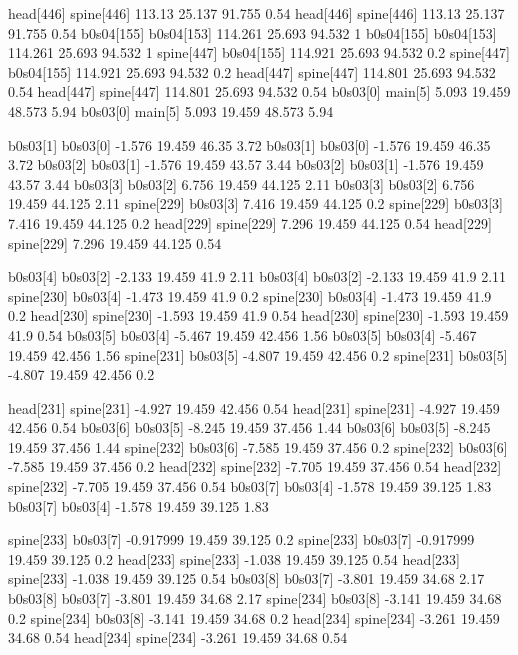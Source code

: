 head[446]    spine[446]    113.13    25.137    91.755    0.54
head[446]    spine[446]    113.13    25.137    91.755    0.54
b0s04[155]    b0s04[153]    114.261    25.693    94.532    1
b0s04[155]    b0s04[153]    114.261    25.693    94.532    1
spine[447]    b0s04[155]    114.921    25.693    94.532    0.2
spine[447]    b0s04[155]    114.921    25.693    94.532    0.2
head[447]    spine[447]    114.801    25.693    94.532    0.54
head[447]    spine[447]    114.801    25.693    94.532    0.54
b0s03[0]    main[5]    5.093    19.459    48.573    5.94
b0s03[0]    main[5]    5.093    19.459    48.573    5.94


b0s03[1]    b0s03[0]    -1.576    19.459    46.35    3.72
b0s03[1]    b0s03[0]    -1.576    19.459    46.35    3.72
b0s03[2]    b0s03[1]    -1.576    19.459    43.57    3.44
b0s03[2]    b0s03[1]    -1.576    19.459    43.57    3.44
b0s03[3]    b0s03[2]    6.756    19.459    44.125    2.11
b0s03[3]    b0s03[2]    6.756    19.459    44.125    2.11
spine[229]    b0s03[3]    7.416    19.459    44.125    0.2
spine[229]    b0s03[3]    7.416    19.459    44.125    0.2
head[229]    spine[229]    7.296    19.459    44.125    0.54
head[229]    spine[229]    7.296    19.459    44.125    0.54


b0s03[4]    b0s03[2]    -2.133    19.459    41.9    2.11
b0s03[4]    b0s03[2]    -2.133    19.459    41.9    2.11
spine[230]    b0s03[4]    -1.473    19.459    41.9    0.2
spine[230]    b0s03[4]    -1.473    19.459    41.9    0.2
head[230]    spine[230]    -1.593    19.459    41.9    0.54
head[230]    spine[230]    -1.593    19.459    41.9    0.54
b0s03[5]    b0s03[4]    -5.467    19.459    42.456    1.56
b0s03[5]    b0s03[4]    -5.467    19.459    42.456    1.56
spine[231]    b0s03[5]    -4.807    19.459    42.456    0.2
spine[231]    b0s03[5]    -4.807    19.459    42.456    0.2


head[231]    spine[231]    -4.927    19.459    42.456    0.54
head[231]    spine[231]    -4.927    19.459    42.456    0.54
b0s03[6]    b0s03[5]    -8.245    19.459    37.456    1.44
b0s03[6]    b0s03[5]    -8.245    19.459    37.456    1.44
spine[232]    b0s03[6]    -7.585    19.459    37.456    0.2
spine[232]    b0s03[6]    -7.585    19.459    37.456    0.2
head[232]    spine[232]    -7.705    19.459    37.456    0.54
head[232]    spine[232]    -7.705    19.459    37.456    0.54
b0s03[7]    b0s03[4]    -1.578    19.459    39.125    1.83
b0s03[7]    b0s03[4]    -1.578    19.459    39.125    1.83


spine[233]    b0s03[7]    -0.917999    19.459    39.125    0.2
spine[233]    b0s03[7]    -0.917999    19.459    39.125    0.2
head[233]    spine[233]    -1.038    19.459    39.125    0.54
head[233]    spine[233]    -1.038    19.459    39.125    0.54
b0s03[8]    b0s03[7]    -3.801    19.459    34.68    2.17
b0s03[8]    b0s03[7]    -3.801    19.459    34.68    2.17
spine[234]    b0s03[8]    -3.141    19.459    34.68    0.2
spine[234]    b0s03[8]    -3.141    19.459    34.68    0.2
head[234]    spine[234]    -3.261    19.459    34.68    0.54
head[234]    spine[234]    -3.261    19.459    34.68    0.54


